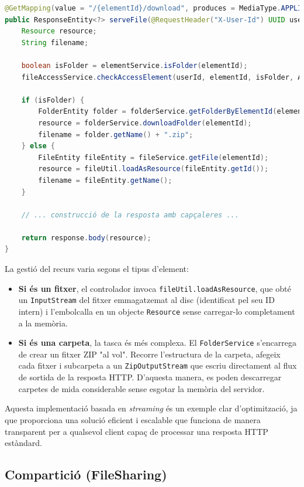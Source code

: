 \begin{lstlisting}[language=Java, caption={Endpoint per a la descàrrega d'elements a `ElementController`}]
@GetMapping(value = "/{elementId}/download", produces = MediaType.APPLICATION_OCTET_STREAM_VALUE)
public ResponseEntity<?> serveFile(@RequestHeader("X-User-Id") UUID userId, @PathVariable("elementId") UUID elementId) {
    Resource resource;
    String filename;

    boolean isFolder = elementService.isFolder(elementId);
    fileAccessService.checkAccessElement(userId, elementId, isFolder, AccessType.READ);

    if (isFolder) {
        FolderEntity folder = folderService.getFolderByElementId(elementId, false);
        resource = folderService.downloadFolder(elementId);
        filename = folder.getName() + ".zip";
    } else {
        FileEntity fileEntity = fileService.getFile(elementId);
        resource = fileUtil.loadAsResource(fileEntity.getId());
        filename = fileEntity.getName();
    }

    // ... construcció de la resposta amb capçaleres ...

    return response.body(resource);
}
\end{lstlisting}

La gestió del recurs varia segons el tipus d'element:
\begin{itemize}
    \item \textbf{Si és un fitxer}, el controlador invoca \texttt{fileUtil.loadAsResource}, que obté un \texttt{InputStream} del fitxer emmagatzemat al disc (identificat pel seu ID intern) i l'embolcalla en un objecte \texttt{Resource} sense carregar-lo completament a la memòria.
    \item \textbf{Si és una carpeta}, la tasca és més complexa. El \texttt{FolderService} s'encarrega de crear un fitxer ZIP "al vol". Recorre l'estructura de la carpeta, afegeix cada fitxer i subcarpeta a un \texttt{ZipOutputStream} que escriu directament al flux de sortida de la resposta HTTP. D'aquesta manera, es poden descarregar carpetes de mida considerable sense esgotar la memòria del servidor.
\end{itemize}

Aquesta implementació basada en \textit{streaming} és un exemple clar d'optimització, ja que proporciona una solució eficient i escalable que funciona de manera transparent per a qualsevol client capaç de processar una resposta HTTP estàndard.

\subsection{Compartició (FileSharing)}

